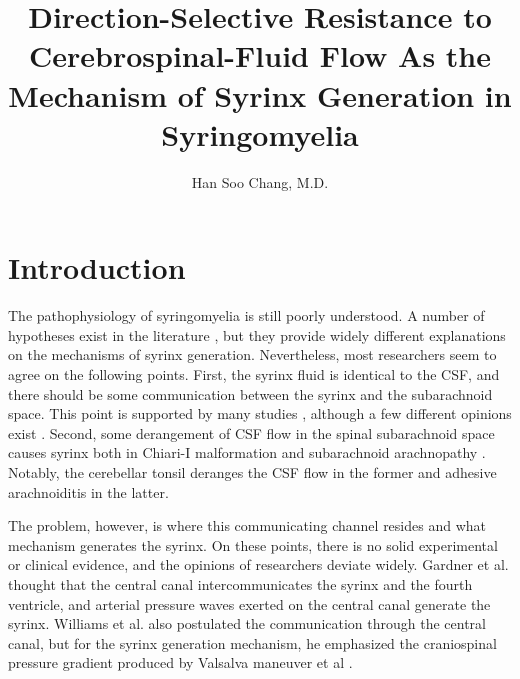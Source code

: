 \documentclass[fleqn,10pt]{wlscirep}
\title{Direction-Selective Resistance to Cerebrospinal-Fluid Flow As
the Mechanism of Syrinx Generation in Syringomyelia}
\author{Han Soo Chang, M.D.}
\affil{Department of Neurosurgery, Tokai University\\Isehara, Japan}
\begin{document}
\flushbottom
\maketitle
%
%
\thispagestyle{empty}


\section*{Introduction}

The pathophysiology of syringomyelia is still poorly understood. A number
of hypotheses exist in the literature \cite{gardner1958mechanism,
williams1980pathogenesis, milhorat1999chiari, ball1972pathogenesis,
klekamp2002pathophysiology, duboulay1974mechanism, heiss1999elucidating,
milhorat1993anatomical, stoodley2000pathophysiology, terae1994increased,
chang2003hypothesis, chang2004theoretical, greitz2006unraveling}, but they
provide widely different explanations on the mechanisms of syrinx
generation.  Nevertheless, most researchers seem to agree on the following
points. First, the syrinx fluid is identical to the CSF, and there should
be some communication between the syrinx and the subarachnoid space. This
point is supported by many studies \cite{ellertsson1969syringomyelia,
ellertsson1969myelocystographic, li1987conventional, heiss2019origin},
although a few different opinions exist \cite{greitz2006unraveling,
koyanagi1997surgical}. Second, some derangement of CSF flow in the spinal
subarachnoid space causes syrinx both in Chiari-I malformation
\cite{wolpert1994chiari, bhadelia1995cerebrospinal, heiss1999elucidating,
hofmann2000phasecontrast, quigley2004cerebrospinal} and subarachnoid
arachnopathy \cite{klekamp1997treatment, brodbelt2003altered,
heiss2012pathophysiology, chang2014dorsal}. Notably, the cerebellar tonsil
deranges the CSF flow in the former and adhesive arachnoiditis in the
latter.

The problem, however, is where this communicating channel resides and what
mechanism generates the syrinx. On these points, there is no solid
experimental or clinical evidence, and the opinions of researchers deviate
widely. Gardner et al. \cite{gardner1958mechanism} thought that the central
canal intercommunicates the syrinx and the fourth ventricle, and arterial
pressure waves exerted on the central canal generate the syrinx. Williams
et al. also postulated the communication through the central canal, but for
the syrinx generation mechanism, he emphasized the craniospinal pressure
gradient produced by Valsalva maneuver et al
\cite{williams1980pathogenesis}.
\end{document}
